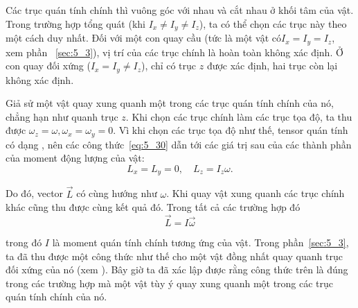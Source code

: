 Các trục quán tính chính thì vuông góc với nhau và cắt nhau ở khối tâm của vật. Trong trường hợp tổng quát (khi $I_x\neq I_y\neq I_z$), ta có thể chọn các trục này theo một cách duy nhất. Đối với một con quay cầu (tức là một vật có$I_x=I_y=I_z$, xem phần ~\ref{sec:5_3}), vị trí của các trục chính là hoàn toàn không xác định. Ở con quay đối xứng ($I_x=I_y\neq I_z$), chỉ có trục $z$ được xác định, hai trục còn lại không xác định.

Giả sử một vật quay xung quanh một trong các trục quán tính chính của nó, chẳng hạn như quanh trục $z$. Khi chọn các trục chính làm các trục tọa độ, ta thu được $\omega_z=\omega, \omega_x=\omega_y=0$. Vì khi chọn các trục tọa độ như thế, tensor quán tính có dạng , nên các công thức~\eqref{eq:5_30} dẫn tới các giá trị sau của các thành phần của moment động lượng của vật:
\begin{equation*}
L_x = L_y = 0,\quad L_z=I_z\omega.
\end{equation*}

\noindent
Do đó, vector $\vec{L}$ có cùng hướng như $\omega$. Khi quay vật xung quanh các trục chính khác cũng thu được cùng kết quả đó. Trong tất cả các trường hợp đó
\begin{equation*}
\vec{L} = I\vec{\omega}
\end{equation*}

\noindent
trong đó $I$ là moment quán tính chính tương ứng của vật. Trong phần~\ref{sec:5_3}, ta đã thu được một công thức như thế cho một vật đồng nhất quay quanh trục đối xứng của nó (xem ). Bây giờ ta đã xác lập được rằng công thức trên là đúng trong các trường hợp mà một vật tùy ý quay xung quanh một trong các trục quán tính chính của nó.

